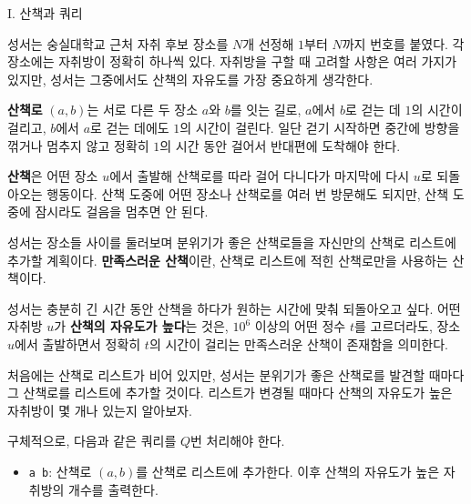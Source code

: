 \def\probtitle{산책과 쿼리}
\def\probno{I}

\begin{problem}{\probno{}. \probtitle{}}

성서는 숭실대학교 근처 자취 후보 장소를 $N$개 선정해 $1$부터 $N$까지 번호를 붙였다. 각 장소에는 자취방이 정확히 하나씩 있다. 자취방을 구할 때 고려할 사항은 여러 가지가 있지만, 성서는 그중에서도 산책의 자유도를 가장 중요하게 생각한다.

\textbf{산책로} $(a, b)$는 서로 다른 두 장소 $a$와 $b$를 잇는 길로, $a$에서 $b$로 걷는 데 $1$의 시간이 걸리고, $b$에서 $a$로 걷는 데에도 $1$의 시간이 걸린다. 일단 걷기 시작하면 중간에 방향을 꺾거나 멈추지 않고 정확히 $1$의 시간 동안 걸어서 반대편에 도착해야 한다.

\textbf{산책}은 어떤 장소 $u$에서 출발해 산책로를 따라 걸어 다니다가 마지막에 다시 $u$로 되돌아오는 행동이다. 산책 도중에 어떤 장소나 산책로를 여러 번 방문해도 되지만, 산책 도중에 잠시라도 걸음을 멈추면 안 된다.

성서는 장소들 사이를 둘러보며 분위기가 좋은 산책로들을 자신만의 산책로 리스트에 추가할 계획이다. \textbf{만족스러운 산책}이란, 산책로 리스트에 적힌 산책로만을 사용하는 산책이다.

성서는 충분히 긴 시간 동안 산책을 하다가 원하는 시간에 맞춰 되돌아오고 싶다. 어떤 자취방 $u$가 \textbf{산책의 자유도가 높다}는 것은, $10^6$ 이상의 어떤 정수 $t$를 고르더라도, 장소 $u$에서 출발하면서 정확히 $t$의 시간이 걸리는 만족스러운 산책이 존재함을 의미한다.

처음에는 산책로 리스트가 비어 있지만, 성서는 분위기가 좋은 산책로를 발견할 때마다 그 산책로를 리스트에 추가할 것이다. 리스트가 변경될 때마다 산책의 자유도가 높은 자취방이 몇 개나 있는지 알아보자.

구체적으로, 다음과 같은 쿼리를 $Q$번 처리해야 한다.
\begin{itemize}
    \item \texttt{a b}: 산책로 $(a, b)$를 산책로 리스트에 추가한다. 이후 산책의 자유도가 높은 자취방의 개수를 출력한다.
\end{itemize}

\begin{center}
\end{center}


\end{problem}
